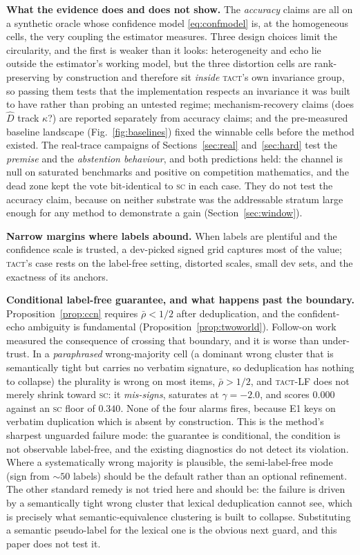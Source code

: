 \documentclass{article}
\newcommand{\Dhat}{\widehat{D}}
\newcommand{\SC}{\textsc{sc}}
\newcommand{\TACT}{\textsc{tact}}
\begin{document}
\textbf{What the evidence does and does not show.} The \emph{accuracy} claims are all on a synthetic oracle whose confidence model \eqref{eq:confmodel} is, at the homogeneous cells, the very coupling the estimator measures. Three design choices limit the circularity, and the first is weaker than it
looks: heterogeneity and echo lie outside the estimator's working model, but
the three distortion cells are rank-preserving by construction and therefore
sit \emph{inside} \TACT's own invariance group, so passing them tests that the
implementation respects an invariance it was built to have rather than
probing an untested regime; mechanism-recovery claims (does $\Dhat$ track $\kappa$?) are reported separately from accuracy claims; and the pre-measured baseline landscape (Fig.~\ref{fig:baselines}) fixed the winnable cells before the method existed. The real-trace campaigns of Sections~\ref{sec:real} and~\ref{sec:hard} test the \emph{premise} and the \emph{abstention behaviour}, and both predictions held: the channel is null on saturated benchmarks and positive on competition mathematics, and the dead zone kept the vote bit-identical to \SC{} in each case. They do not test the accuracy claim, because on neither substrate was the addressable stratum large enough for any method to demonstrate a gain (Section~\ref{sec:window}).

\textbf{Narrow margins where labels abound.} When labels are plentiful and the confidence scale is trusted, a dev-picked signed grid captures most of the value; \TACT's case rests on the label-free setting, distorted scales, small dev sets, and the exactness of its anchors.

\textbf{Conditional label-free guarantee, and what happens past the boundary.}
Proposition~\ref{prop:ccn} requires $\bar\rho<1/2$ after deduplication, and the
confident-echo ambiguity is fundamental (Proposition~\ref{prop:twoworld}).
Follow-on work measured the consequence of crossing that boundary, and it is
worse than under-trust. In a \emph{paraphrased} wrong-majority cell (a dominant
wrong cluster that is semantically tight but carries no verbatim signature, so
deduplication has nothing to collapse) the plurality is wrong on most items,
$\bar\rho>1/2$, and \TACT-LF does not merely shrink toward \SC: it
\emph{mis-signs}, saturates at $\gamma=-2.0$, and scores $0.000$ against an
\SC{} floor of $0.340$. None of the four alarms fires, because E1 keys on
verbatim duplication which is absent by construction. This is the method's
sharpest unguarded failure mode: the guarantee is conditional, the condition is
not observable label-free, and the existing diagnostics do not detect its
violation. Where a systematically wrong majority is plausible, the
semi-label-free mode (sign from ${\sim}50$ labels) should be the default rather
than an optional refinement. The other standard remedy is not tried here and
should be: the failure is driven by a semantically tight wrong cluster that
lexical deduplication cannot see, which is precisely what semantic-equivalence
clustering \citep{kuhn2023semantic} is built to collapse. Substituting a
semantic pseudo-label for the lexical one is the obvious next guard, and this
paper does not test it.
\end{document}
